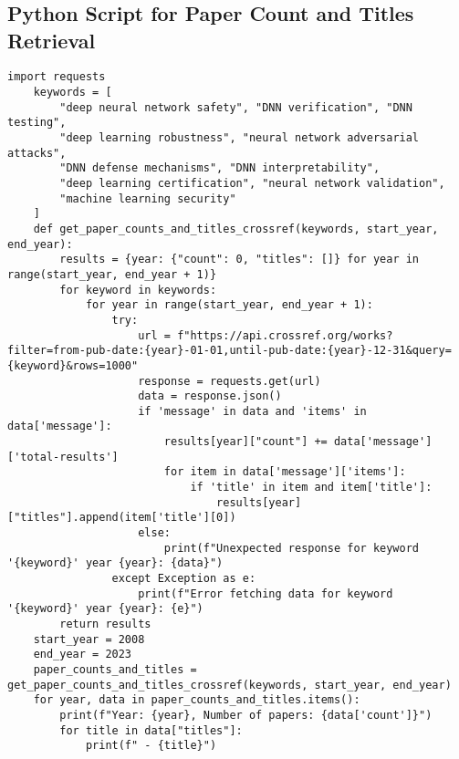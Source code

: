    \chapter{}
   \label{code}
   \begin{appendix}
    \section{Python Script for Paper Count and Titles Retrieval}
    \begin{lstlisting}[caption={Python script to retrieve paper counts and titles using CrossRef API}, label={lst:crossref_script}]
    import requests 
    keywords = [
        "deep neural network safety", "DNN verification", "DNN testing",
        "deep learning robustness", "neural network adversarial attacks",
        "DNN defense mechanisms", "DNN interpretability",
        "deep learning certification", "neural network validation",
        "machine learning security"
    ]
    def get_paper_counts_and_titles_crossref(keywords, start_year, end_year):
        results = {year: {"count": 0, "titles": []} for year in range(start_year, end_year + 1)}
        for keyword in keywords:
            for year in range(start_year, end_year + 1):
                try:
                    url = f"https://api.crossref.org/works?filter=from-pub-date:{year}-01-01,until-pub-date:{year}-12-31&query={keyword}&rows=1000"
                    response = requests.get(url)
                    data = response.json()
                    if 'message' in data and 'items' in data['message']:
                        results[year]["count"] += data['message']['total-results']
                        for item in data['message']['items']:
                            if 'title' in item and item['title']:
                                results[year]["titles"].append(item['title'][0])
                    else:
                        print(f"Unexpected response for keyword '{keyword}' year {year}: {data}")
                except Exception as e:
                    print(f"Error fetching data for keyword '{keyword}' year {year}: {e}")
        return results
    start_year = 2008
    end_year = 2023
    paper_counts_and_titles = get_paper_counts_and_titles_crossref(keywords, start_year, end_year) 
    for year, data in paper_counts_and_titles.items():
        print(f"Year: {year}, Number of papers: {data['count']}")
        for title in data["titles"]:
            print(f" - {title}")

    \end{lstlisting}
    \end{appendix}